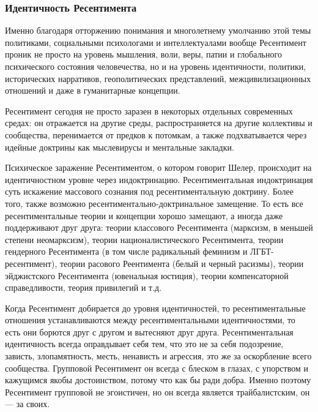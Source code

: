  
 
 
 
 

\subsubsection{Идентичность Ресентимента}

Именно благодаря отторжению понимания и многолетнему умолчанию этой темы
политиками, социальными психологами и интеллектуалами вообще Ресентимент проник
не просто на уровень мышления, воли, веры, патии и глобального психического
состояния человечества, но и на уровень идентичности, политики, исторических
нарративов, геополитических представлений, межцивилизационных отношений и даже
в гуманитарные концепции.

Ресентимент сегодня не просто заразен в некоторых отдельных современных средах:
он отражается на другие среды, распространяется на другие коллективы и
сообщества, перенимается от предков к потомкам, а также подхватывается через
идейные доктрины как мыслевирусы и ментальные закладки.

Психическое заражение Ресентиментом, о котором говорит Шелер, происходит на
идентичностном уровне через индоктринацию. Ресентиментальная индоктринация суть
искажение массового сознания под ресентиментальную доктрину. Более того, также
возможно ресентиментально-доктринальное замещение. То есть все
ресентиментальные теории и концепции хорошо замещают, а иногда даже
поддерживают друг друга: теории классового Ресентимента (марксизм, в меньшей
степени неомарксизм), теории националистического Ресентимента, теории
гендерного Ресентимента (в том числе радикальный феминизм и ЛГБТ-ресентимент),
теории расового Реентимента (белый и черный расизмы), теории эйджистского
Ресентимента (ювенальная юстиция), теории компенсаторной справедливости, теория
привилегий и т.д.

Когда Ресентимент добирается до уровня идентичностей, то ресентиментальные
отношения устанавливаются между ресентиментальными идентичностями, то есть они
борются друг с другом и вытесняют друг друга. Ресентиментальная идентичность
всегда оправдывает себя тем, что это не за себя подозрение, зависть,
злопамятность, месть, ненависть и агрессия, это же за оскорбление всего
сообщества. Групповой Ресентимент он всегда с блеском в глазах, с упорством и
кажущимся якобы достоинством, потому что как бы ради добра. Именно поэтому
Ресентимент групповой не эгоистичен, но он всегда является трайбалистским, он —
за своих.

